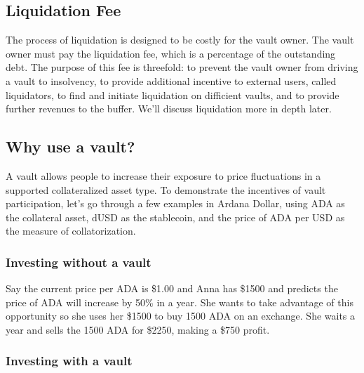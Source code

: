 \documentclass[12pt]{article}
\begin{document}
\subsection{Liquidation Fee}

The process of liquidation is designed to be costly for the vault owner. The vault owner must pay the liquidation fee, which is a percentage of the outstanding debt. The purpose of this fee is threefold: to prevent the vault owner from driving a vault to insolvency, to provide additional incentive to external users, called liquidators, to find and initiate liquidation on difficient vaults, and to provide further revenues to the buffer. We'll discuss liquidation more in depth later.

\subsection{Why use a vault?}

A vault allows people to increase their exposure to price fluctuations in a supported collateralized asset type. To demonstrate the incentives of vault participation, let's go through a few examples in Ardana Dollar, using ADA as the collateral asset, dUSD as the stablecoin, and the price of ADA per USD as the measure of collatorization.

	\subsubsection{Investing without a vault}

Say the current price per ADA is \$1.00 and Anna has \$1500 and predicts the price of ADA will increase by 50\% in a year. She wants to take advantage of this opportunity so she uses her \$1500 to buy 1500 ADA on an exchange. She waits a year and sells the 1500 ADA for \$2250, making a \$750 profit.

	\subsubsection{Investing with a vault}
\end{document}
